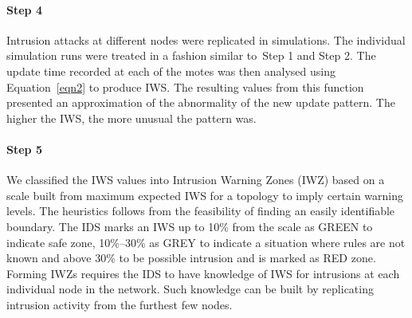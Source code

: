 \documentclass{CRPITStyle}
\begin{document}
\paragraph*{Step 4}   Intrusion attacks at different nodes were replicated in simulations.
The individual simulation runs were treated in a fashion  similar to~Step 1 and Step 2.
The update time recorded at each of the motes was then analysed using Equation~\ref{eqn2} to produce IWS.
The resulting values from this function presented an approximation of the abnormality of the new update pattern. The higher the IWS, the more unusual the pattern was. 
\paragraph*{Step 5}  We classified the IWS values into Intrusion Warning Zones (IWZ) based on a scale built from maximum expected IWS for a topology to imply certain warning levels.
The heuristics follows from %
the feasibility of finding an easily identifiable boundary.
The IDS marks an IWS up to 10\% from the scale as GREEN to indicate safe zone,
10\%--30\% as GREY to indicate a situation where rules are not known and 
above 30\% to be possible intrusion and is marked as RED zone.
Forming IWZs requires the IDS to have knowledge of IWS for  intrusions at each individual node in the network.
Such knowledge can be built by replicating intrusion activity from the furthest few nodes.
\end{document}
